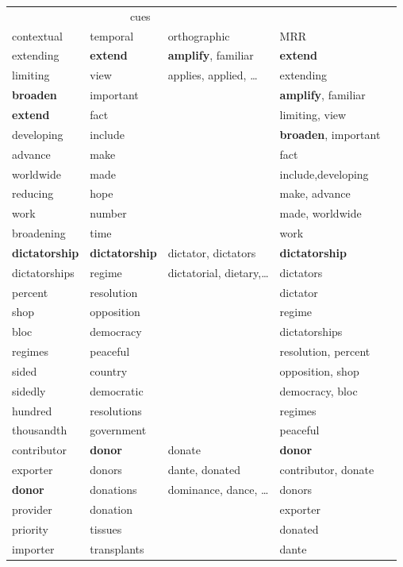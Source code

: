 \documentclass{article}
\begin{document}
\begin{table}[h!]
\setlength{\tabcolsep}{1ex}
\footnotesize
\begin{center}
\begin{tabular}{lllll}
\multicolumn{3}{c}{cues}\\
\cline{1-3}
contextual		&	temporal	&	orthographic	&	MRR	\\
\hline
extending	&	{\bf extend}	&	{\bf amplify}, familiar &	{\bf extend}\\
limiting	&	view	&	 applies, applied, \dots 	&	extending\\
{\bf broaden}	&	important	&	 	&	{\bf amplify}, familiar	\\
{\bf extend}	&	fact	&	 	&	 limiting, view\\
developing	&	include	&	 	&	{\bf broaden}, important\\
advance	&	make	&	 	&	fact\\
worldwide	&	made	&	 	&	 include,developing\\
reducing	&	hope	&	 	&	make, advance\\
work	&	number	&	 	&	made, worldwide\\
broadening	&	time	&	 	&	work\\
\hline
{\bf dictatorship}	&	{\bf dictatorship}	&	 dictator, dictators &	{\bf dictatorship}	\\
dictatorships	&	regime	&	dictatorial, dietary,\dots 	&	dictators\\
percent	&	resolution	&	 	&	dictator\\
shop	&	opposition	&	 	&	regime\\
bloc	&	democracy	&	 	&	dictatorships\\
regimes	&	peaceful	&	 	&	resolution, percent\\
sided	&	country	&	 	&	 opposition, shop\\
sidedly	&	democratic	&	 	&	democracy, bloc\\
hundred	&	resolutions	&	 	&	regimes\\
thousandth	&	government	&	 	&	peaceful\\
\hline
contributor	&	{\bf donor}	&	donate  	&	{\bf donor}	\\
exporter	&	donors	&	dante, donated  	&	contributor, donate\\
{\bf donor}	&	donations	&	 dominance, dance, \dots	&	donors\\
provider	&	donation	&	  	&	exporter\\
priority	&	tissues	&	  	&	donated\\
importer	&	transplants	&	  	&	dante\\

\end{tabular}
\end{center}
\end{table}
\end{document}
